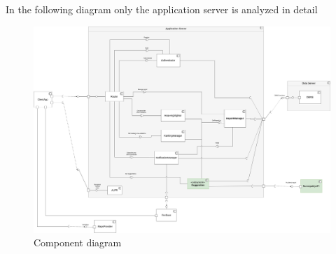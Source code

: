 \documentclass{article}
\begin{document}
In the following diagram only the application server is analyzed in detail

\begin{figure}[h!]
\centering
	\includegraphics[width=1.0\textwidth]{images/components-diagram.png}
	\caption{Component diagram}
	\label{fig:component-diagram}
\end{figure}
\end{document}
